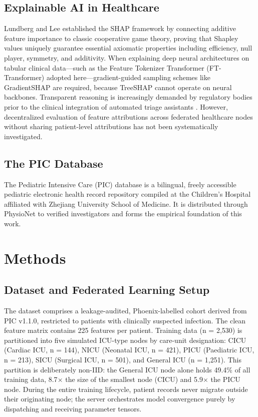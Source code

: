 \documentclass[conference]{IEEEtran}
\begin{document}
\subsection{Explainable AI in Healthcare}
Lundberg and Lee \cite{lundberg2017shap} established the SHAP framework by connecting
additive feature importance to classic cooperative game theory, proving that Shapley
values uniquely guarantee essential axiomatic properties including efficiency, null
player, symmetry, and additivity. When explaining deep neural architectures on tabular
clinical data---such as the Feature Tokenizer Transformer (FT-Transformer)
\cite{gorishniy2021revisiting} adopted here---gradient-guided sampling schemes
like GradientSHAP are required, because TreeSHAP cannot operate on neural backbones.
Transparent reasoning is increasingly demanded by regulatory bodies prior to the
clinical integration of automated triage assistants \cite{athukorala2026explainable}.
However, decentralized evaluation of feature attributions across federated healthcare
nodes without sharing patient-level attributions has not been systematically investigated.

\subsection{The PIC Database}
The Pediatric Intensive Care (PIC) database \cite{zeng2020pic} is a bilingual,
freely accessible pediatric electronic health record repository compiled at the
Children's Hospital affiliated with Zhejiang University School of Medicine. It is
distributed through PhysioNet to verified investigators and forms the empirical
foundation of this work.

\section{Methods}

\subsection{Dataset and Federated Learning Setup}
The dataset comprises a leakage-audited, Phoenix-labelled cohort derived
from PIC v1.1.0, restricted to patients with clinically suspected infection.
The clean feature matrix contains 225 features per patient. Training data
(n = 2{,}530) is partitioned into five simulated ICU-type nodes by care-unit
designation: CICU (Cardiac ICU, n = 144), NICU (Neonatal ICU, n = 421), PICU
(Paediatric ICU, n = 213), SICU (Surgical ICU, n = 501), and General ICU
(n = 1{,}251). This partition is deliberately non-IID: the General ICU node
alone holds 49.4\% of all training data, 8.7$\times$ the size of the
smallest node (CICU) and 5.9$\times$ the PICU node. During the entire training
lifecycle, patient records never migrate outside their originating node; the
server orchestrates model convergence purely by dispatching and receiving
parameter tensors.
\end{document}
